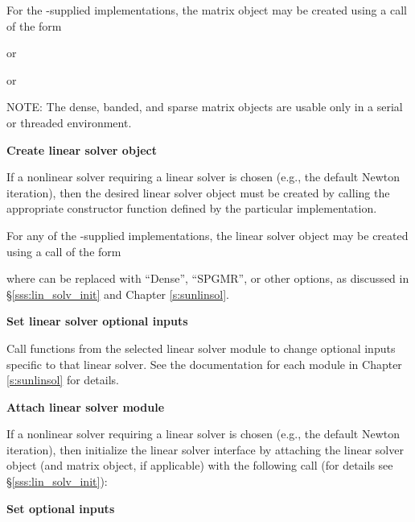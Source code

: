 \begin{Steps}
  For the {\sundials}-supplied {\sunmatrix} implementations, the
  matrix object may be created using a call of the form


   or


   or


  NOTE: The dense, banded, and sparse matrix objects are usable only in a
  serial or threaded environment.

\item\label{i:lin_solver}
  {\bf Create linear solver object}

  If a nonlinear solver requiring a linear solver is chosen (e.g., the default
  Newton iteration), then the desired linear solver object must be created by
  calling the appropriate constructor function defined by the particular
  {\sunlinsol} implementation.

  For any of the {\sundials}-supplied {\sunlinsol} implementations,
  the linear solver object may be created using a call of the form


  where \id{*} can be replaced with ``Dense'', ``SPGMR'', or other
  options, as discussed in \S\ref{sss:lin_solv_init} and Chapter {\ref{s:sunlinsol}}.

\item
  {\bf Set linear solver optional inputs}

  Call  functions from the selected linear solver module
  to change optional inputs specific to that linear solver.
  See the documentation for each {\sunlinsol} module in Chapter
  {\ref{s:sunlinsol}} for details.

\item\label{i:lin_solver_interface}
  {\bf Attach linear solver module}

  If a nonlinear solver requiring a linear solver is chosen (e.g., the default
  Newton iteration), then initialize the {\idals} linear solver
  interface by attaching the linear solver object (and matrix object, if
  applicable) with the following call (for details see
  \S\ref{sss:lin_solv_init}):


\item
  {\bf Set optional inputs}


\end{Steps}
